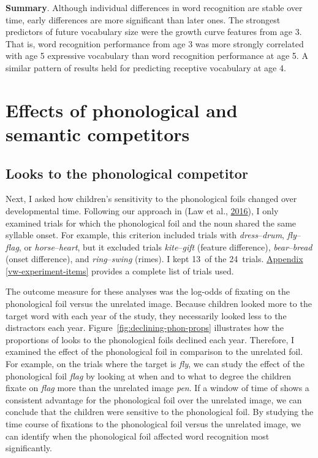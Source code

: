 \documentclass [11pt, proquest] {uwthesis}[2015/03/03]
\begin{document}
\textbf{Summary}. Although individual differences in word recognition
are stable over time, early differences are more significant than later
ones. The strongest predictors of future vocabulary size were the growth
curve features from age 3. That is, word recognition performance from
age 3 was more strongly correlated with age 5 expressive vocabulary than
word recognition performance at age 5. A similar pattern of results held
for predicting receptive vocabulary at age 4.

\chapter{Effects of phonological and semantic
competitors}\label{effects-of-phonological-and-semantic-competitors}

\section{Looks to the phonological
competitor}\label{looks-to-the-phonological-competitor}

Next, I asked how children's sensitivity to the phonological foils
changed over developmental time. Following our approach in (Law et al.,
\protect\hyperlink{ref-RWLPaper}{2016}), I only examined trials for
which the phonological foil and the noun shared the same syllable onset.
For example, this criterion included trials with
\emph{dress}--\emph{drum}, \emph{fly}--\emph{flag}, or
\emph{horse}--\emph{heart}, but it excluded trials
\emph{kite}--\emph{gift} (feature difference), \emph{bear}--\emph{bread}
(onset difference), and \emph{ring}--\emph{swing} (rimes). I kept 13~of
the 24~trials. \protect\hyperlink{vw-experiment-items}{Appendix
\ref{vw-experiment-items}} provides a complete list of trials used.

The outcome measure for these analyses was the log-odds of fixating on
the phonological foil versus the unrelated image. Because children
looked more to the target word with each year of the study, they
necessarily looked less to the distractors each year.
Figure~\ref{fig:declining-phon-props} illustrates how the proportions of
looks to the phonological foils declined each year. Therefore, I
examined the effect of the phonological foil in comparison to the
unrelated foil. For example, on the trials where the target is
\emph{fly}, we can study the effect of the phonological foil \emph{flag}
by looking at when and to what to degree the children fixate on
\emph{flag} more than the unrelated image \emph{pen}. If a window of
time of shows a consistent advantage for the phonological foil over the
unrelated image, we can conclude that the children were sensitive to the
phonological foil. By studying the time course of fixations to the
phonological foil versus the unrelated image, we can identify when the
phonological foil affected word recognition most significantly.
\end{document}
